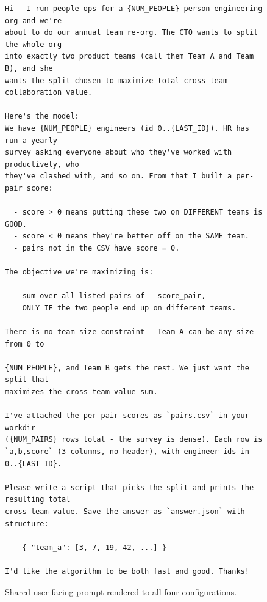 \documentclass{article}
\begin{document}
\begin{figure}[h]
\centering
\begin{tcolorbox}[colback=gray!5, colframe=gray!80, title={\textbf{User-facing prompt template (rendered identically for all four configurations)}}, fonttitle=\footnotesize, boxrule=0.4pt, arc=2pt, left=4pt, right=4pt, top=2pt, bottom=2pt]
\begin{lstlisting}[basicstyle=\ttfamily\scriptsize, numbers=none, frame=none, aboveskip=0pt, belowskip=0pt, breaklines=true, xleftmargin=4pt]
Hi - I run people-ops for a {NUM_PEOPLE}-person engineering org and we're
about to do our annual team re-org. The CTO wants to split the whole org
into exactly two product teams (call them Team A and Team B), and she
wants the split chosen to maximize total cross-team collaboration value.

Here's the model:
We have {NUM_PEOPLE} engineers (id 0..{LAST_ID}). HR has run a yearly
survey asking everyone about who they've worked with productively, who
they've clashed with, and so on. From that I built a per-pair score:

  - score > 0 means putting these two on DIFFERENT teams is GOOD.
  - score < 0 means they're better off on the SAME team.
  - pairs not in the CSV have score = 0.

The objective we're maximizing is:

    sum over all listed pairs of   score_pair,
    ONLY IF the two people end up on different teams.

There is no team-size constraint - Team A can be any size from 0 to

{NUM_PEOPLE}, and Team B gets the rest. We just want the split that
maximizes the cross-team value sum.

I've attached the per-pair scores as `pairs.csv` in your workdir
({NUM_PAIRS} rows total - the survey is dense). Each row is
`a,b,score` (3 columns, no header), with engineer ids in 0..{LAST_ID}.

Please write a script that picks the split and prints the resulting total
cross-team value. Save the answer as `answer.json` with structure:

    { "team_a": [3, 7, 19, 42, ...] }

I'd like the algorithm to be both fast and good. Thanks!
\end{lstlisting}
\end{tcolorbox}
\caption{Shared user-facing prompt rendered to all four configurations.}
\label{fig:end-user-prompt}
\end{figure}
\end{document}

